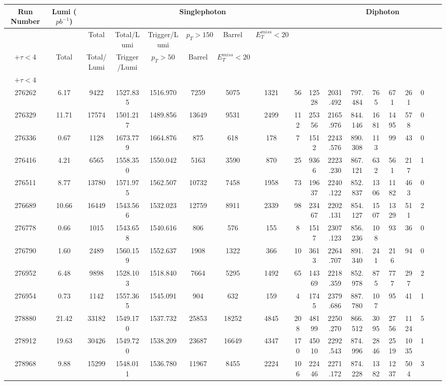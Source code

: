 \documentclass[10pt]{extarticle}
\begin{document}
\begin{longtable}{|c|c|c|c|c|c|c|c|c|c|c|c|c|c|c|c|c|c|}
\hline 
Run Number & Lumi ($pb^{-1}$) & \multicolumn{8}{|c|}{Singlephoton} & \multicolumn{8}{|c|}{Diphoton} \\ 
\hline 
 & & Total & Total/Lumi & Trigger/Lumi & $p_{T} > 150$ & Barrel & $E_{T}^{miss} < 20$ & \begin{tabular}{@{}c@{}} $E_{T}^{miss} > 75$ \\ $+ \tau < 4$ \end{tabular} & Total & Total/Lumi & Trigger/Lumi & $p_{T} > 50$ & Barrel & $E_{T}^{miss} < 20$ & \begin{tabular}{@{}c@{}} $E_{T}^{miss} > 75$ \\ $+ \tau < 4$ \end{tabular} \\ 
\hline 
276262&6.17&9422&1527.835&1516.970&7259&5075&1321&56&12528&2031.492&797.484&765&671&261&0 \\ 
\hline 
276329&11.71&17574&1501.217&1489.856&13649&9531&2499&112&25356&2165.976&844.146&1681&1495&578&0 \\ 
\hline 
276336&0.67&1128&1673.779&1664.876&875&618&178&7&1512&2243.576&890.308&113&99&43&0 \\ 
\hline 
276416&4.21&6565&1558.350&1550.042&5163&3590&870&25&9366&2223.230&867.121&632&561&217&1 \\ 
\hline 
276511&8.77&13780&1571.975&1562.507&10732&7458&1958&73&19637&2240.122&852.837&1306&1182&463&0 \\ 
\hline 
276689&10.66&16449&1543.566&1532.023&12759&8911&2339&98&23467&2202.131&854.127&1507&1329&511&2 \\ 
\hline 
276778&0.66&1015&1543.658&1540.616&806&576&155&8&1517&2307.123&856.236&108&93&36&0 \\ 
\hline 
276790&1.60&2489&1560.159&1552.637&1908&1322&366&10&3613&2264.707&891.340&241&216&94&0 \\ 
\hline 
276952&6.48&9898&1528.103&1518.840&7664&5295&1492&65&14369&2218.359&852.978&875&777&297&2 \\ 
\hline 
276954&0.73&1142&1557.365&1545.091&904&632&159&4&1745&2379.686&887.780&107&95&41&1 \\ 
\hline 
278880&21.42&33182&1549.170&1537.732&25853&18252&4845&208&48199&2250.270&866.512&3095&2756&1124&5 \\ 
\hline 
278912&19.63&30426&1549.720&1538.209&23687&16649&4347&170&45010&2292.543&874.996&2846&2519&1035&1 \\ 
\hline 
278968&9.88&15299&1548.011&1536.780&11967&8455&2224&106&22446&2271.172&874.228&1382&1237&504&3 \\ 

\end{longtable}
\end{document}
